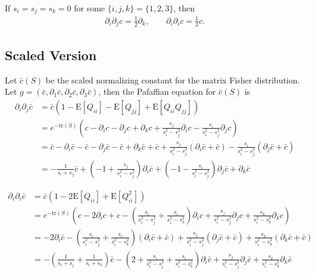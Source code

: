 \documentclass[10pt]{article}
\newcommand{\tr}[1]{\ensuremath{\mathrm{tr}\left( #1 \right)}}
\newcommand{\expect}[1]{\ensuremath{\mathrm{E}\left[ #1 \right]}}
\begin{document}
If $s_i=s_j=s_k=0$ for some $\{i,j,k\}=\{1,2,3\}$, then
\begin{align}
	\partial_i\partial_jc = \frac{1}{2}\partial_k, \qquad \partial_i\partial_ic = \frac{1}{3}c.
\end{align}

\subsection{Scaled Version}
Let $\bar{c}(S)$ be the scaled normalizing constant for the matrix Fisher distribution.
Let $g=(\bar{c}, \partial_1\bar{c}, \partial_2\bar{c}, \partial_3\bar{c})$, then the Pafaffian equation for $\bar{c}(S)$ is
\begin{align}
	\partial_i\partial_j \bar{c} &= \bar{c}(1-\expect{Q_{ii}}-\expect{Q_{jj}}+\expect{Q_{ii}Q_{jj}}) \nonumber \\
	&= e^{-\tr{S}}\left( c - \partial_ic - \partial_jc + \partial_kc + \frac{s_j}{s_i^2-s_j^2}\partial_ic - \frac{s_i}{s_i^2-s_j^2}\partial_jc \right) \nonumber \\
	&= \bar{c} - \partial_i\bar{c} - \bar{c} - \partial_j\bar{c} - \bar{c} + \partial_k\bar{c} + \bar{c} + \frac{s_j}{s_i^2-s_j^2}(\partial_i\bar{c} + \bar{c}) - \frac{s_i}{s_i^2-s_j^2}(\partial_j\bar{c}+\bar{c}) \nonumber \\
	&= -\frac{1}{s_i+s_j}\bar{c} +  \left(-1+\frac{s_j}{s_i^2-s_j^2}\right)\partial_i\bar{c} + \left(-1-\frac{s_i}{s_i^2-s_j^2}\right)\partial_j\bar{c} + \partial_k\bar{c}
\end{align}

\begin{align}
	\partial_i\partial_i \bar{c} &= \bar{c}(1-2\expect{Q_{ii}}+\expect{Q_{ii}^2}) \nonumber \\
	&= e^{-\tr{S}}\left( c - 2\partial_ic + c - \left(\frac{s_i}{s_i^2-s_j^2}+\frac{s_i}{s_i^2-s_k^2}\right)\partial_ic + \frac{s_j}{s_i^2-s_j^2}\partial_jc + \frac{s_k}{s_i^2-s_k^2}\partial_kc \right) \nonumber \\
	&= -2\partial_i\bar{c} - \left(\frac{s_i}{s_i^2-s_j^2}+\frac{s_i}{s_i^2-s_k^2}\right)(\partial_i\bar{c}+\bar{c}) + \frac{s_j}{s_i^2-s_j^2}(\partial_j\bar{c} + \bar{c}) + \frac{s_k}{s_i^2-s_k^2}(\partial_k\bar{c}+\bar{c}) \nonumber \\
	&= -\left(\frac{1}{s_i+s_j}+\frac{1}{s_i+s_k}\right)\bar{c} - \left(2+\frac{s_i}{s_i^2-s_j^2}+\frac{s_i}{s_i^2-s_k^2}\right)\partial_i\bar{c} + \frac{s_j}{s_i^2-s_j^2}\partial_j\bar{c} + \frac{s_k}{s_i^2-s_k^2}\partial_k\bar{c}
\end{align}
\end{document}
